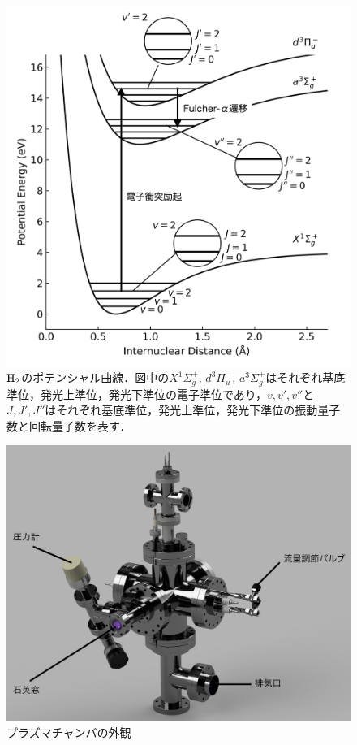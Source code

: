 \listoffigures
{}

\begin{figure}
    \centering
    \includegraphics[width=15cm]{pictures/energy-level.png}
    \caption[$\rm{H}_2$のポテンシャル曲線]{$\rm{H}_2$のポテンシャル曲線．図中の$X^1 \Sigma^+_g$, $d^3 \Pi^-_u$, $a^3 \Sigma^+_g$はそれぞれ基底準位，発光上準位，発光下準位の電子準位であり，$v, v', v''$と$J, J', J''$はそれぞれ基底準位，発光上準位，発光下準位の振動量子数と回転量子数を表す．}
    \label{fig:energy-level}
\end{figure}

\begin{figure}
    \centering
    \includegraphics[width=15cm]{pictures/chamber-picture.png}
    \caption{プラズマチャンバの外観}
    \label{fig:chamber-picture}
\end{figure}

